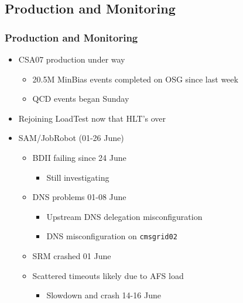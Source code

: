 \documentclass{beamer}
\begin{document}
\subsection{Production and Monitoring}
\begin{frame}
    \frametitle{Production and Monitoring}
    \begin{itemize}
        \item CSA07 production under way
        \begin{itemize}
            \item 20.5M MinBias events completed on OSG since last week
            \item QCD events began Sunday
        \end{itemize}
        \item Rejoining LoadTest now that HLT's over
        \item SAM/JobRobot (01-26 June)
        \begin{itemize}
            \item BDII failing since 24 June
            \begin{itemize}
                \item Still investigating
            \end{itemize}
            \item DNS problems 01-08 June
            \begin{itemize}
                \item Upstream DNS delegation misconfiguration
                \item DNS misconfiguration on {\tt cmsgrid02}
            \end{itemize}
            \item SRM crashed 01 June
            \item Scattered timeouts likely due to AFS load
            \begin{itemize}
                \item Slowdown and crash 14-16 June
            \end{itemize}
        \end{itemize}
    \end{itemize}
\end{frame}
\end{document}
